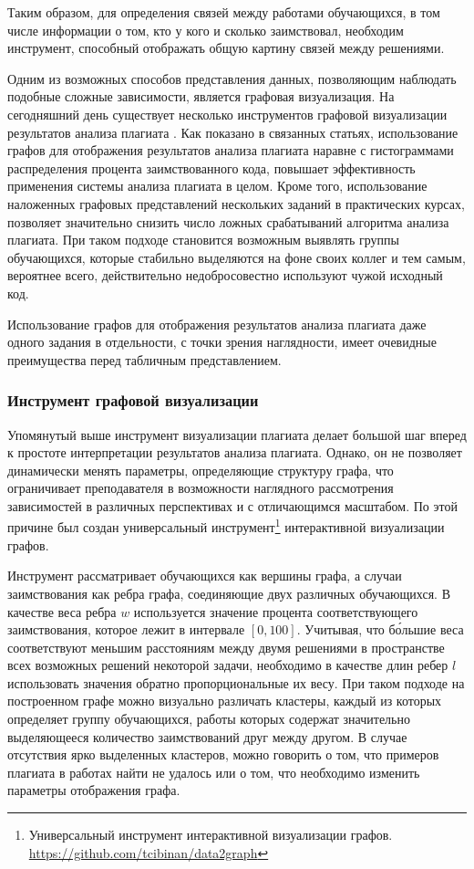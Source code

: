 \documentclass[a4paper,14pt]{extarticle}
\begin{document}
Таким образом, для определения связей между работами обучающихся, в том числе информации о том, кто у кого и сколько заимствовал, необходим инструмент, способный отображать общую картину связей между решениями.

Одним из возможных способов представления данных, позволяющим наблюдать подобные сложные зависимости, является графовая визуализация. На сегодняшний день существует несколько инструментов графовой визуализации результатов анализа плагиата \citep{plagiarismGraph}\citep{graphVisualizationCompetition}. Как показано в связанных статьях, использование графов для отображения результатов анализа плагиата наравне с гистограммами распределения процента заимствованного кода, повышает эффективность применения системы анализа плагиата в целом. Кроме того, использование наложенных графовых представлений нескольких заданий в практических курсах, позволяет значительно снизить число ложных срабатываний алгоритма анализа плагиата. При таком подходе становится возможным выявлять группы обучающихся, которые стабильно выделяются на фоне своих коллег и тем самым, вероятнее всего, действительно недобросовестно используют чужой исходный код.

Использование графов для отображения результатов анализа плагиата даже одного задания в отдельности, с точки зрения наглядности, имеет очевидные преимущества перед табличным представлением.

\subsubsection{Инструмент графовой визуализации}

Упомянутый выше инструмент визуализации плагиата делает большой шаг вперед к простоте интерпретации результатов анализа плагиата. Однако, он не позволяет динамически менять параметры, определяющие структуру графа, что ограничивает преподавателя в возможности наглядного рассмотрения зависимостей в различных перспективах и с отличающимся масштабом. По этой причине был создан универсальный инструмент\footnote{Универсальный инструмент интерактивной визуализации графов. \url{https://github.com/tcibinan/data2graph}} интерактивной визуализации графов.

Инструмент рассматривает обучающихся как вершины графа, а случаи заимствования как ребра графа, соединяющие двух различных обучающихся. В качестве веса ребра $w$ используется значение процента соответствующего заимствования, которое лежит в интервале $[0,100]$. Учитывая, что б\'{о}льшие веса соответствуют меньшим расстояниям между двумя решениями в пространстве всех возможных решений некоторой задачи, необходимо в качестве длин ребер $l$ использовать значения обратно пропорциональные их весу. При таком подходе на построенном графе можно визуально различать кластеры, каждый из которых определяет группу обучающихся, работы которых содержат значительно выделяющееся количество заимствований друг между другом. В случае отсутствия ярко выделенных кластеров, можно говорить о том, что примеров плагиата в работах найти не удалось или о том, что необходимо изменить параметры отображения графа.
\end{document}
